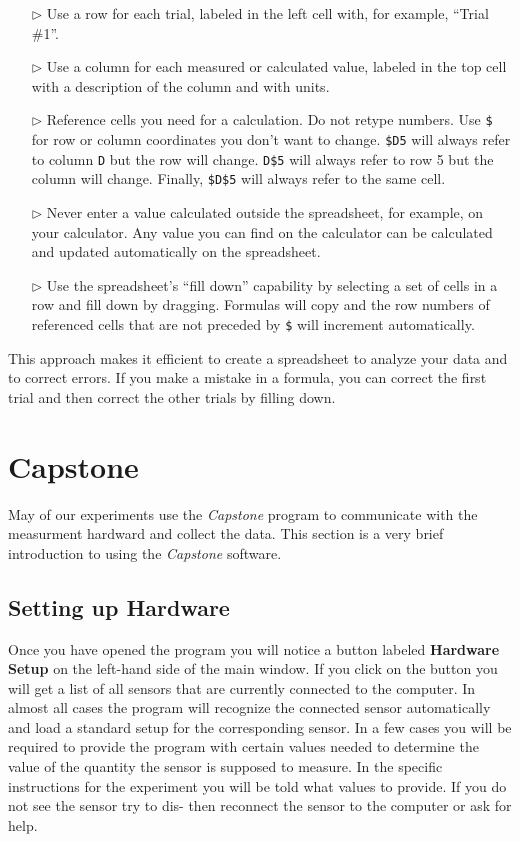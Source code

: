 \begin{itemize}
\item[$\triangleright$] Use a row for each trial, labeled in the left cell with, for example, ``Trial \#1''.
\item[$\triangleright$] Use a column for each measured or calculated value, labeled in the top cell with a description of the column and with units.
\item[$\triangleright$] Reference cells you need for a calculation. Do not retype numbers. Use \texttt{\$} for row or column coordinates you don't want to change. \texttt{\$D5} will always refer to column \texttt{D} but the row will change. \texttt{D\$5} will always refer to row 5 but the column will change. Finally, \texttt{\$D\$5} will always refer to the same cell.
\item[$\triangleright$] Never enter a value calculated outside the spreadsheet, for example, on your calculator. Any value you can find on the calculator can be calculated and updated automatically on the spreadsheet.
\item[$\triangleright$] Use the spreadsheet's ``fill down'' capability by selecting a set of cells in a row and fill down by dragging. Formulas will copy and the row numbers of referenced cells that are not preceded by \texttt{\$} will increment automatically.
\end{itemize}
This approach makes it efficient to create a spreadsheet to analyze your data and to correct errors. If you make a mistake in a formula, you can correct the first trial and then correct the other trials by filling down.

\section{Capstone}
\label{sec:SettingUpHardware}

May of our experiments use the \textsl{Capstone} program to
communicate with the measurment hardward and collect the data.  This
section is a very brief introduction to using the \textsl{Capstone}
software. 

\subsection{Setting up Hardware}

Once you have opened the program you will notice a button labeled \textbf{Hardware Setup} on the left-hand side of the main window. If you click on the button you will get a list of all sensors that are currently connected to the computer. In almost all cases the program will recognize the connected sensor automatically and load a standard setup for the corresponding sensor. In a few cases you will be required to provide the program with certain values needed to determine the value of the quantity the sensor is supposed to measure. In the specific instructions for the experiment you will be told what values to provide. If you do not see the sensor try to dis-  then reconnect the sensor to the computer or ask for help.

